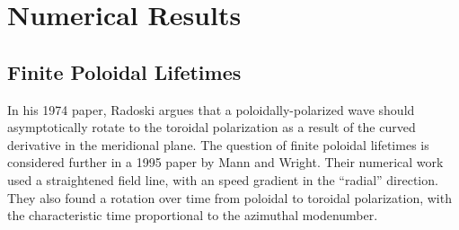 


\chapter{Numerical Results}
  \label{ch_results}






\section{Finite Poloidal Lifetimes}
  \label{sec_lifetimes}

In his 1974 paper, Radoski argues that a poloidally-polarized wave should asymptotically rotate to the toroidal polarization\cite{radoski_1974} as a result of the curved derivative in the meridional plane. The question of finite poloidal lifetimes is considered further in a 1995 paper by Mann and Wright\cite{mann_1995}. Their numerical work used a straightened field line, with an \Alfven speed gradient in the ``radial'' direction. They also found a rotation over time from poloidal to toroidal polarization, with the characteristic time proportional to the azimuthal modenumber. 


